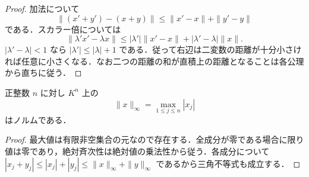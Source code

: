 \begin{proof}
加法について
\[
 \|(x'+y')-(x+y)\|\leq\|x'-x\|+\|y'-y\|
\]
である．スカラー倍については
\[
 \|\lambda'x'-\lambda x\|
 \leq |\lambda'|\|x'-x\|+|\lambda'-\lambda|\|x\|.
\]
$|\lambda'-\lambda|<1$ なら $|\lambda'|\leq|\lambda|+1$ である．従って右辺は二変数の距離が十分小さければ任意に小さくなる．なお二つの距離の和が直積上の距離となることは各公理から直ちに従う．
\end{proof}
\begin{example}[有限直積の最大値ノルム]
正整数 $n$ に対し $K^n$ 上の
\[
 \|x\|_\infty=\max_{1\leq j\leq n}|x_j|
\]
はノルムである．
\end{example}
\begin{proof}
最大値は有限非空集合の元なので存在する．全成分が零である場合に限り値は零であり，絶対斉次性は絶対値の乗法性から従う．各成分について $|x_j+y_j|\leq|x_j|+|y_j|\leq\|x\|_\infty+\|y\|_\infty$ であるから三角不等式も成立する．
\end{proof}
